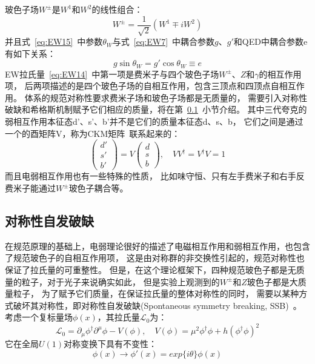 玻色子场$W^{\pm}$是$W^1$和$W^2$的线性组合：
\begin{equation} 
\label{eq:EW16}
W^{\pm}=\frac{1}{\sqrt{2}}\left(   W^1 \mp iW^2  \right)
\end{equation}
并且式~\ref{eq:EW15}~中参数$\theta_W$与式~\ref{eq:EW7}~中耦合参数$g$、$g'$和QED中耦合参数e有如下关系：
\begin{equation} 
\label{eq:EW17}
g \sin \theta_W = g' \cos \theta_W \equiv e
\end{equation}
EW拉氏量~\ref{eq:EW14}~中第一项是费米子与四个玻色子场$W^{\pm}$、$Z$和$\gamma$的相互作用项，
后两项描述的是四个玻色子场的自相互作用，包含三顶点和四顶点自相互作用。
体系的规范对称性要求费米子场和玻色子场都是无质量的，
需要引入对称性破缺和希格斯机制赋予它们相应的质量，将在第~\ref{sec:SSB}~小节介绍。
其中三代夸克的弱相互作用本征态d'、s'、b'并不是它们的质量本征态d、s、b，
它们之间是通过一个的酉矩阵V，称为CKM矩阵~\cite{CKM}联系起来的：
\begin{equation} 
\label{eq:EW18}
 \left( \begin{array}{l} d' \\  s' \\ b' \end{array} \right) = V
 \left( \begin{array}{l} d \\  s \\ b \end{array} \right), \quad VV^{\dagger}=V^{\dagger}V=1
\end{equation}
而且电弱相互作用也有一些特殊的性质，
比如味守恒、只有左手费米子和右手反费米子能通过$W^{\pm}$玻色子耦合等。

\subsection{对称性自发破缺}
\label{sec:SSB}

在规范原理的基础上，电弱理论很好的描述了电磁相互作用和弱相互作用，也包含了规范玻色子的自相互作用项，
这是由对称群的非交换性引起的，规范对称性也保证了拉氏量的可重整性。
但是，在这个理论框架下，四种规范玻色子都是无质量的粒子，对于光子来说确实如此，
但是实验上观测到的$W^{\pm}$和$Z$玻色子都是大质量粒子，
为了赋予它们质量，在保证拉氏量的整体对称性的同时，
需要以某种方式破坏其对称性，即对称性自发破缺(Spontaneous symmetry breaking, SSB)~\cite{SM4,SM5,SM6}。
考虑一个复标量场$\phi(x)$，其拉氏量$\mathcal{L}_0$为：
\begin{equation} 
\label{eq:SSB1}
\mathcal{L}_0= \partial_{\mu} \phi^{\dagger} \partial^{\mu} \phi - V(\phi), \quad
V(\phi)=\mu^2 \phi^{\dagger} \phi + h \left(  \phi^{\dagger} \phi   \right)^2
\end{equation}
它在全局$U(1)$对称变换下具有不变性：
\begin{equation} 
\label{eq:SSB2}
\phi(x)  \rightarrow \phi'(x)= exp\{ i\theta \}\phi(x)
\end{equation}

